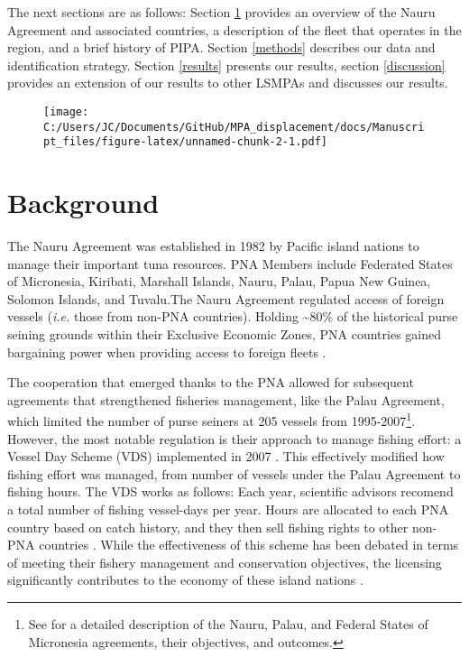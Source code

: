 \documentclass[11pt,]{article}
\let\rmarkdownfootnote\footnote%
\def\footnote{\protect\rmarkdownfootnote}
\begin{document}
The next sections are as follows: Section \ref{background} provides an
overview of the Nauru Agreement and associated countries, a description
of the fleet that operates in the region, and a brief history of PIPA.
Section \ref{methods} describes our data and identification strategy.
Section \ref{results} presents our results, section \ref{discussion}
provides an extension of our results to other LSMPAs and discusses our
results.

\begin{figure}
\centering
\texttt{[image: C:/Users/JC/Documents/GitHub/MPA\_displacement/docs/Manuscript\_files/figure-latex/unnamed-chunk-2-1.pdf]}
\caption{\label{fig:unnamed-chunk-2}\label{fig:LSMPAs_map}}
\end{figure}

\hypertarget{background}{%
\section{Background}\label{background}}

The Nauru Agreement was established in 1982 by Pacific island nations to
manage their important tuna resources. PNA Members include Federated
States of Micronesia, Kiribati, Marshall Islands, Nauru, Palau, Papua
New Guinea, Solomon Islands, and Tuvalu.The Nauru Agreement regulated
access of foreign vessels (\emph{i.e.} those from non-PNA countries).
Holding \textasciitilde{}80\% of the historical purse seining grounds
within their Exclusive Economic Zones, PNA countries gained bargaining
power when providing access to foreign fleets \citep{havice_2010}.

The cooperation that emerged thanks to the PNA allowed for subsequent
agreements that strengthened fisheries management, like the Palau
Agreement, which limited the number of purse seiners at 205 vessels from
1995-2007\footnote{See \citet{havice_2010} for a detailed description of
  the Nauru, Palau, and Federal States of Micronesia agreements, their
  objectives, and outcomes.}. However, the most notable regulation is
their approach to manage fishing effort: a Vessel Day Scheme (VDS)
implemented in 2007 \citep{havice_2013}. This effectively modified how
fishing effort was managed, from number of vessels under the Palau
Agreement to fishing hours. The VDS works as follows: Each year,
scientific advisors recomend a total number of fishing vessel-days per
year. Hours are allocated to each PNA country based on catch history,
and they then sell fishing rights to other non-PNA countries
\citep{aqorau_2018}. While the effectiveness of this scheme has been
debated in terms of meeting their fishery management and conservation
objectives, the licensing significantly contributes to the economy of
these island nations \citep{havice_2010}.
\end{document}
